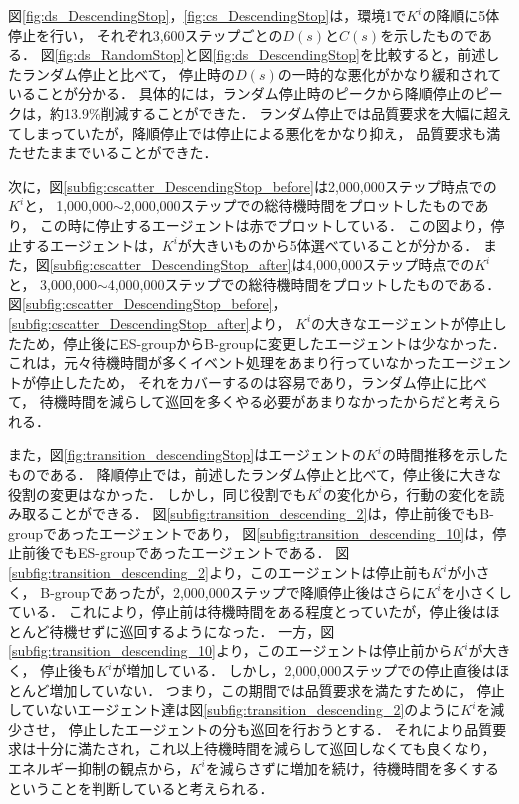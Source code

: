 \documentclass[12pt,a4j,twoside]{jarticle}
\begin{document}
  図\ref{fig:ds_DescendingStop}，\ref{fig:cs_DescendingStop}は，環境1で$K^i$の降順に5体停止を行い，
  それぞれ3,600ステップごとの$D(s)$と$C(s)$を示したものである．
  図\ref{fig:ds_RandomStop}と図\ref{fig:ds_DescendingStop}を比較すると，前述したランダム停止と比べて，
  停止時の$D(s)$の一時的な悪化がかなり緩和されていることが分かる．
  具体的には，ランダム停止時のピークから降順停止のピークは，約13.9\%削減することができた．
  ランダム停止では品質要求を大幅に超えてしまっていたが，降順停止では停止による悪化をかなり抑え，
  品質要求も満たせたままでいることができた．
  \par
  
  次に，図\ref{subfig:cscatter_DescendingStop_before}は2,000,000ステップ時点での$K^i$と，
  1,000,000$\sim$2,000,000ステップでの総待機時間をプロットしたものであり，
  この時に停止するエージェントは赤でプロットしている．
  この図より，停止するエージェントは，$K^i$が大きいものから5体選べていることが分かる．
  また，図\ref{subfig:cscatter_DescendingStop_after}は4,000,000ステップ時点での$K^i$と，
  3,000,000$\sim$4,000,000ステップでの総待機時間をプロットしたものである．
  図\ref{subfig:cscatter_DescendingStop_before}，\ref{subfig:cscatter_DescendingStop_after}より，
  $K^i$の大きなエージェントが停止したため，停止後にES-groupからB-groupに変更したエージェントは少なかった．
  これは，元々待機時間が多くイベント処理をあまり行っていなかったエージェントが停止したため，
  それをカバーするのは容易であり，ランダム停止に比べて，
  待機時間を減らして巡回を多くやる必要があまりなかったからだと考えられる．
  \par

  また，図\ref{fig:transition_descendingStop}はエージェントの$K^i$の時間推移を示したものである．
  降順停止では，前述したランダム停止と比べて，停止後に大きな役割の変更はなかった．
  しかし，同じ役割でも$K^i$の変化から，行動の変化を読み取ることができる．
  図\ref{subfig:transition_descending_2}は，停止前後でもB-groupであったエージェントであり，
  図\ref{subfig:transition_descending_10}は，停止前後でもES-groupであったエージェントである．
  図\ref{subfig:transition_descending_2}より，このエージェントは停止前も$K^i$が小さく，
  B-groupであったが，2,000,000ステップで降順停止後はさらに$K^i$を小さくしている．
  これにより，停止前は待機時間をある程度とっていたが，停止後はほとんど待機せずに巡回するようになった．
  一方，図\ref{subfig:transition_descending_10}より，このエージェントは停止前から$K^i$が大きく，
  停止後も$K^i$が増加している．
  しかし，2,000,000ステップでの停止直後はほとんど増加していない．
  つまり，この期間では品質要求を満たすために，
  停止していないエージェント達は図\ref{subfig:transition_descending_2}のように$K^i$を減少させ，
  停止したエージェントの分も巡回を行おうとする．
  それにより品質要求は十分に満たされ，これ以上待機時間を減らして巡回しなくても良くなり，
  エネルギー抑制の観点から，$K^i$を減らさずに増加を続け，待機時間を多くするということを判断していると考えられる．
  \par
\end{document}

